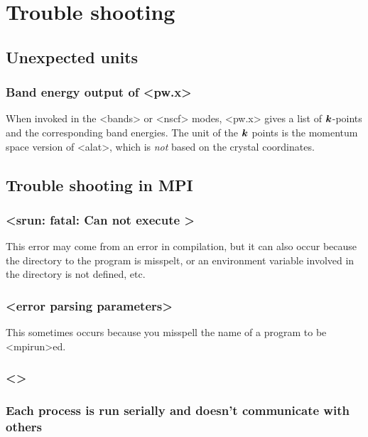 \documentclass[hyperref, a4paper, 12pt]{report}
\def\texttt#1{<#1>}%
\newcommand{\shortcode}[1]{\texttt{#1}}
\begin{document}
\chapter{Trouble shooting}

\section{Unexpected units}

\subsection{Band energy output of \shortcode{pw.x}}

When invoked in the \shortcode{bands} or \shortcode{nscf} modes, 
\shortcode{pw.x} gives a list of $\vb*{k}$-points 
and the corresponding band energies. 
The unit of the $\vb*{k}$ points is the momentum space version of \shortcode{alat},
which is \emph{not} based on the crystal coordinates.

\section{Trouble shooting in MPI}

\subsection{\shortcode{srun: fatal: Can not execute }}

This error may come from an error in compilation,
but it can also occur because the directory to the program is misspelt,
or an environment variable involved in the directory is not defined, etc. 

\subsection{\shortcode{error parsing parameters}}

This sometimes occurs because you misspell the name of a program 
to be \shortcode{mpirun}ed.

\subsection{\shortcode{}}

\subsection{Each process is run serially and doesn't communicate with others}
\end{document}

